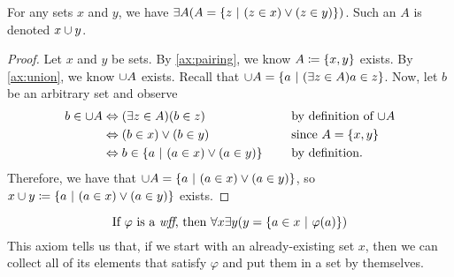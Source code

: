 \begin{theorem}\label{thm:union}
    For any sets \(x\) and \(y\),
    we have \(\exists A \pn*{A = \set*{z \suchthat \pn*{z \in x} \join \pn*{z \in y}}}\).
    Such an \(A\) is denoted \(x \cup y\).
\end{theorem}
\begin{proof}
    Let \(x\) and \(y\) be sets.
    By \autoref{ax:pairing}, we know \(A \defn \set*{x, y}\) exists.
    By \autoref{ax:union}, we know \(\cup A\) exists.
    Recall that \(\union A = \set*{a \suchthat \pn*{\exists z \in A}{a \in z}}\).
    Now, let \(b\) be an arbitrary set and observe
    \begin{alignat*}{2}
        b \in \union A &\iff \pn*{\exists z \in A}\pn*{b \in z} &&\text{by definition of \(\union A\)} \\
                       &\iff (b \in x) \join (b \in y) &&\text{since \(A = \set*{x, y}\)} \\
                       &\iff b \in \set*{a \suchthat (a \in x) \join (a \in y)}~~~~&&\text{by definition}.
    \end{alignat*}
    Therefore, we have that \(\union A = \set*{a \suchthat (a \in x) \join (a \in y)}\),
    so \(x \union y \defn \set*{a \suchthat (a \in x) \join (a \in y)}\) exists.
\end{proof}

\begin{axiom}[Separation]\label{ax:separation}
    \vspace{-\abovedisplayskip}
    \[
        \text{If \(\varphi\) is a \wff, then }
        \forall x \exists y \pn*{y = \set*{a \in x \suchthat \varphi(a)}}
    \]
    This axiom tells us that, if we start with an already-existing set \(x\),
    then we can collect all of its elements that satisfy \(\varphi\)
    and put them in a set by themselves.
\end{axiom}

